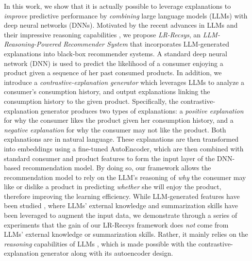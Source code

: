 
In this work, we show that it is actually possible to leverage explanations to \emph{improve} predictive performance by \emph{combining} large language models (LLMs) with deep neural networks (DNNs). Motivated by the recent advances in LLMs and their impressive reasoning capabilities \citep{wei2022chain}, we propose \emph{LR-Recsys}, an \emph{LLM-Reasoning-Powered Recommender System} that incorporates LLM-generated explanations into black-box recommender systems. A standard deep neural network (DNN) is used to predict the likelihood of a consumer enjoying a product given a sequence of her past consumed products. In addition, we introduce a \emph{contrastive-explanation generator} which leverages LLMs to analyze a consumer's consumption history, and output explanations linking the consumption history to the given product. Specifically, the contrastive-explanation generator produces two types of explanations: a \emph{positive explanation} for why the consumer likes the product given her consumption history, and a \emph{negative explanation} for why the consumer may not like the product. Both explanations are in natural language. These explanations are then transformed into embeddings using a fine-tuned AutoEncoder, which are then combined with standard consumer and product features to form the input layer of the DNN-based recommendation model. By doing so, our framework allows the recommendation model to rely on the LLM's reasoning of \emph{why} the consumer may like or dislike a product in predicting \emph{whether} she will enjoy the product, therefore improving the learning efficiency. While LLM-generated features have been studied \citep{lin2023can}, where LLMs' external knowledge and summarization skills have been leveraged to augment the input data, we demonstrate through a series of experiments that the gain of our LR-Recsys framework does \emph{not} come from LLMs' external knowledge or summarization skills. Rather, it mainly relies on the \emph{reasoning} capabilities of LLMs \citep{brown2020language, wei2022chain}, which is made possible with the contrastive-explanation generator along with its autoencoder design. 


